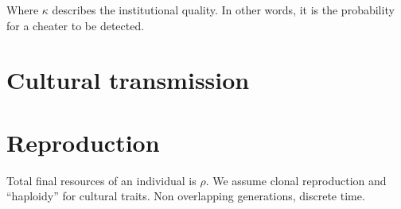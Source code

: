 \documentclass[a4paper]{article}
\begin{document}
Where $\kappa$ describes the institutional quality. In other words, it is the probability for a cheater to be detected.
 
\section{Cultural transmission}
\label{sec:trans}


\section{Reproduction}
\label{sec:repro}

Total final resources of an individual is $\rho$. 
We assume clonal reproduction and ``haploidy'' for cultural traits. Non overlapping generations, discrete time.

%
%
\end{document}
